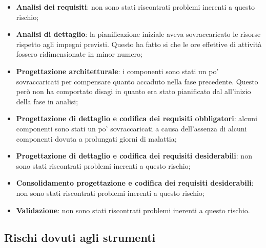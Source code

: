 			\begin{itemize}
				\item \textbf{Analisi dei requisiti}: non sono stati riscontrati problemi inerenti a questo rischio;
				\item \textbf{Analisi di dettaglio}: la pianificazione iniziale aveva sovraccaricato le risorse rispetto agli impegni previsti. Questo ha fatto si che le ore effettive di attività fossero ridimensionate in minor numero;
				\item \textbf{Progettazione architetturale}: i componenti sono stati un po' sovraccaricati per compensare quanto accaduto nella fase precedente. Questo però non ha comportato disagi in quanto era stato pianificato dal \roleProjectManager{} all'inizio della fase in analisi;
				\item \textbf{Progettazione di dettaglio e codifica dei requisiti obbligatori}: alcuni componenti sono stati un po' sovraccaricati a causa dell'assenza di alcuni componenti dovuta a prolungati giorni di malattia;
				\item \textbf{Progettazione di dettaglio e codifica dei requisiti desiderabili}: non sono stati riscontrati problemi inerenti a questo rischio;
				\item \textbf{Consolidamento progettazione e codifica dei requisiti desiderabili}: non sono stati riscontrati problemi inerenti a questo rischio;
				\item \textbf{Validazione}: non sono stati riscontrati problemi inerenti a questo rischio.
			\end{itemize}



	\subsection{Rischi dovuti agli strumenti} %
	\label{sub:rischi_dovuti_agli_strumenti}
